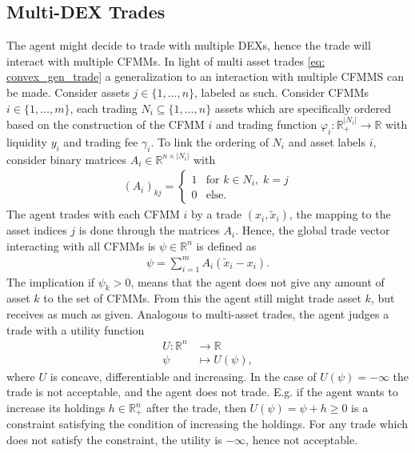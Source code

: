 \subsection{Multi-DEX Trades}
The agent might decide to trade with multiple DEXs, hence the trade will
interact with multiple CFMMs. In light of multi asset trades
\ref{eq: convex_gen_trade} a generalization to an interaction with multiple CFMMS can
be made. Consider assets $j \in \{1, \ldots,n\}$, labeled as such. Consider
CFMMs $i \in \{1,\ldots,m\}$, each trading $N_i \subseteq \{1,\ldots,n\}  $
assets which are specifically ordered based on the construction of the CFMM
$i$ and trading function $\varphi_i: \mathbb{R}^{|N_i|}_+\to \mathbb{R}$ with
liquidity $y_i$ and trading fee $\gamma_i$. To link the ordering of $N_i$ and
asset labels $i$, consider binary matrices $A_i \in \mathbb{R}^{n\times
|N_i|}$ with
\begin{align}
    (A_i)_{kj} =
    \begin{cases}
        1 & \text{for } k \in N_i, \; k = j \\
        0 & \text{else}.
        \end{cases}
\end{align}
The agent trades with each CFMM $i$ by a trade $(x_i, \tilde{x}_i)$, the
mapping to the asset indices $j$ is done through the matrices $A_i$. Hence,
the global trade vector interacting with all CFMMs is $\psi \in
\mathbb{R}^{n}$ is defined as
\begin{align}
    \psi = \sum_{i=1}^{m} A_i(\tilde{x}_i-x_i).
\end{align}
The implication if $\psi_k > 0$, means that the agent does not give any
amount of asset $k$ to the set of CFMMs. From this the agent still might
trade asset $k$, but receives as much as given. Analogous to multi-asset
trades, the agent judges a trade with a utility function
\begin{align}
    U:\mathbb{R}^{n}&\to\mathbb{R}\\
    \psi &\mapsto U(\psi),
\end{align}
where $U$ is concave, differentiable and increasing. In the case of $U(\psi)
= -\infty$ the trade is not acceptable, and the agent does not trade. E.g. if
the agent wants to increase its holdings $h\in \mathbb{R}_+^{n}$ after the
trade, then $U(\psi) = \psi + h \ge 0$ is a constraint satisfying the
condition of increasing the holdings. For any trade which does not satisfy
the constraint, the utility is $-\infty$, hence not acceptable.

